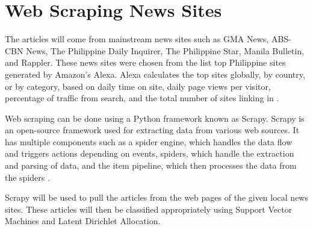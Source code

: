 \section{Web Scraping News Sites}
The articles will come from mainstream news sites such as GMA News, ABS-CBN News, The Philippine Daily Inquirer, The Philippine Star, Manila Bulletin, and Rappler. These news sites were chosen from the list top Philippine sites generated by Amazon's Alexa. Alexa calculates the top sites globally, by country, or by category, based on daily time on site, daily page views per visitor, percentage of traffic from search, and the total number of sites linking in \cite{alexa}.

Web scraping can be done using a Python framework known as Scrapy. Scrapy is an open-source framework used for extracting data from various web sources. It has multiple components such as a spider engine, which handles the data flow and triggers actions depending on events, spiders, which handle the extraction and parsing of data, and the item pipeline, which then processes the data from the spiders \cite{nisafani2017eliciting}.

Scrapy will be used to pull the articles from the web pages of the given local news sites. These articles will then be classified appropriately using Support Vector Machines and Latent Dirichlet Allocation.